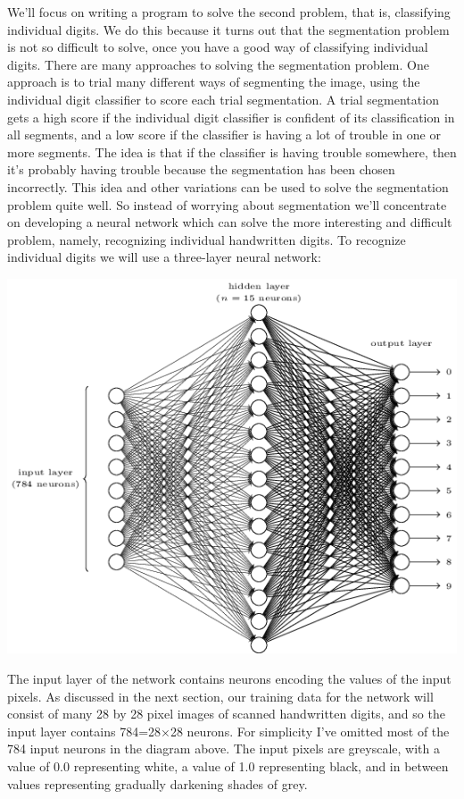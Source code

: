 We'll focus on writing a program to solve the second problem, that is, classifying individual digits. We do this because it turns out that the segmentation problem is not so difficult to solve, once you have a good way of classifying individual digits. There are many approaches to solving the segmentation problem. One approach is to trial many different ways of segmenting the image, using the individual digit classifier to score each trial segmentation. A trial segmentation gets a high score if the individual digit classifier is confident of its classification in all segments, and a low score if the classifier is having a lot of trouble in one or more segments. The idea is that if the classifier is having trouble somewhere, then it's probably having trouble because the segmentation has been chosen incorrectly. This idea and other variations can be used to solve the segmentation problem quite well. So instead of worrying about segmentation we'll concentrate on developing a neural network which can solve the more interesting and difficult problem, namely, recognizing individual handwritten digits.
To recognize individual digits we will use a three-layer neural network:

{\centering
\includegraphics[width=\textwidth,]{pic/tikz12}
\par}

The input layer of the network contains neurons encoding the values of the input pixels. As discussed in the next section, our training data for the network will consist of many 28 by 28 pixel images of scanned handwritten digits, and so the input layer contains 784=28$\times$28 neurons. For simplicity I've omitted most of the 784 input neurons in the diagram above. The input pixels are greyscale, with a value of 0.0 representing white, a value of 1.0 representing black, and in between values representing gradually darkening shades of grey.

